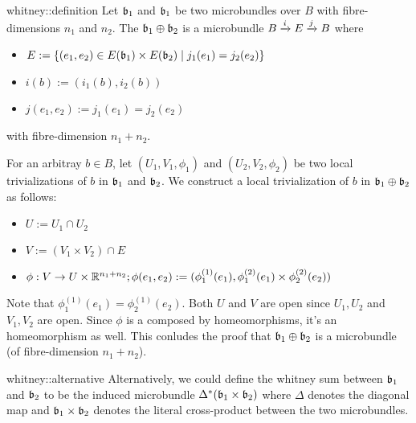 \begin{mydefinition}{whitney::definition}
    Let $\bb_1$ and $\bb_1$ be two microbundles over $B$ with fibre-dimensions $n_1$ and $n_2$.
    The  $\wsum{\bb_1}{\bb_2}$ is a microbundle $\bundle{B}{E}{i}{j}$ where
    \begin{itemize}
        \item $E := \{ (e_1, e_2) \in E(\bb_1) \times E(\bb_2) \mid j_1(e_1) = j_2(e_2)\}$
        \item $i(b) := (i_1(b), i_2(b))$
        \item $j(e_1, e_2) := j_1(e_1) = j_2(e_2)$
    \end{itemize}
    with fibre-dimension $n_1 + n_2$.
\end{mydefinition}
\begin{myproof}
    For an arbitray $b \in B$, let $(U_1, V_1, \phi_1)$ and $(U_2, V_2, \phi_2)$ be two local trivializations of $b$ in $\bb_1$ and $\bb_2$.
    We construct a local trivialization of $b$ in $\bb_1 \oplus \bb_2$ as follows:
    \begin{itemize}
        \item $U := U_1 \cap U_2$
        \item $V := (V_1 \times V_2) \cap E$
        \item $\phi: V \to U \times \R^{n_1 + n_2}; \phi(e_1, e_2) := (\phi_1^{(1)}(e_1), \phi_1^{(2)}(e_1) \times  \phi_2^{(2)}(e_2))$
    \end{itemize}
    Note that $\phi_1^{(1)}(e_1) = \phi_2^{(1)}(e_2)$.
    Both $U$ and $V$ are open since $U_1, U_2$ and $V_1, V_2$ are open.
    Since $\phi$ is a composed by homeomorphisms, it's an homeomorphism as well.
    This conludes the proof that $\bb_1 \oplus \bb_2$ is a microbundle (of fibre-dimension $n_1 + n_2$).
\end{myproof}

\begin{myremark}{whitney::alternative}
    Alternatively, we could define the whitney sum between $\bb_1$ and $\bb_2$ to be the induced microbundle $\Delta^*(\bb_1 \times \bb_2)$
    where $\Delta$ denotes the diagonal map and $\bb_1 \times \bb_2$ denotes the literal cross-product between the two microbundles.
\end{myremark}